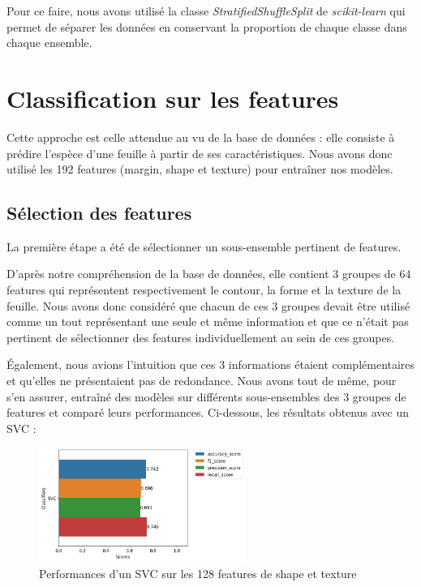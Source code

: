 \documentclass{article}
\begin{document}
Pour ce faire, nous avons utilisé la classe
\textit{StratifiedShuffleSplit} \cite{SSS} de \textit{scikit-learn} qui permet de séparer les données
en conservant la proportion de chaque classe dans chaque ensemble.

\newpage
\section{Classification sur les features}
Cette approche est celle attendue au vu de la base de données : elle consiste à prédire l'espèce
d'une feuille à partir de ses caractéristiques. Nous avons donc utilisé les 192 features
(margin, shape et texture) pour entraîner nos modèles.

\subsection{Sélection des features}
La première étape a été de sélectionner un sous-ensemble pertinent de features. 

D'après notre
compréhension de la base de données, elle contient 3 groupes de 64 features qui représentent
respectivement le contour, la forme et la texture de la feuille. Nous avons donc considéré
que chacun de ces 3 groupes devait être utilisé comme un tout représentant
une seule et même information et que ce n'était pas pertinent
de sélectionner des features individuellement au sein de ces groupes.

Également, nous avions l'intuition que ces 3 informations étaient complémentaires et qu'elles
ne présentaient pas de redondance. Nous avons tout de même, pour s'en assurer, entraîné des
modèles sur différents sous-ensembles des 3 groupes de features et comparé leurs performances. 
Ci-dessous, les résultats obtenus avec un SVC \cite{SVC} :

\begin{figure}[h]
    \centering
    \includegraphics[width=0.6\textwidth]{img/svc_perfs_without_margin.png}
    \caption{Performances d'un SVC sur les 128 features de shape et texture}
\end{figure}
\end{document}
